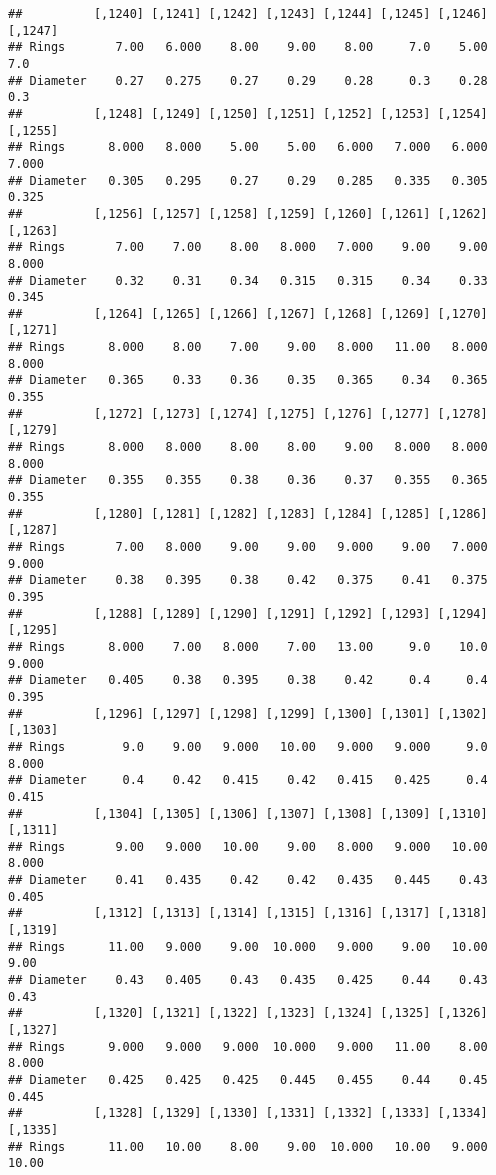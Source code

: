 \documentclass[
]{article}
\begin{document}
\begin{verbatim}
##          [,1240] [,1241] [,1242] [,1243] [,1244] [,1245] [,1246] [,1247]
## Rings       7.00   6.000    8.00    9.00    8.00     7.0    5.00     7.0
## Diameter    0.27   0.275    0.27    0.29    0.28     0.3    0.28     0.3
##          [,1248] [,1249] [,1250] [,1251] [,1252] [,1253] [,1254] [,1255]
## Rings      8.000   8.000    5.00    5.00   6.000   7.000   6.000   7.000
## Diameter   0.305   0.295    0.27    0.29   0.285   0.335   0.305   0.325
##          [,1256] [,1257] [,1258] [,1259] [,1260] [,1261] [,1262] [,1263]
## Rings       7.00    7.00    8.00   8.000   7.000    9.00    9.00   8.000
## Diameter    0.32    0.31    0.34   0.315   0.315    0.34    0.33   0.345
##          [,1264] [,1265] [,1266] [,1267] [,1268] [,1269] [,1270] [,1271]
## Rings      8.000    8.00    7.00    9.00   8.000   11.00   8.000   8.000
## Diameter   0.365    0.33    0.36    0.35   0.365    0.34   0.365   0.355
##          [,1272] [,1273] [,1274] [,1275] [,1276] [,1277] [,1278] [,1279]
## Rings      8.000   8.000    8.00    8.00    9.00   8.000   8.000   8.000
## Diameter   0.355   0.355    0.38    0.36    0.37   0.355   0.365   0.355
##          [,1280] [,1281] [,1282] [,1283] [,1284] [,1285] [,1286] [,1287]
## Rings       7.00   8.000    9.00    9.00   9.000    9.00   7.000   9.000
## Diameter    0.38   0.395    0.38    0.42   0.375    0.41   0.375   0.395
##          [,1288] [,1289] [,1290] [,1291] [,1292] [,1293] [,1294] [,1295]
## Rings      8.000    7.00   8.000    7.00   13.00     9.0    10.0   9.000
## Diameter   0.405    0.38   0.395    0.38    0.42     0.4     0.4   0.395
##          [,1296] [,1297] [,1298] [,1299] [,1300] [,1301] [,1302] [,1303]
## Rings        9.0    9.00   9.000   10.00   9.000   9.000     9.0   8.000
## Diameter     0.4    0.42   0.415    0.42   0.415   0.425     0.4   0.415
##          [,1304] [,1305] [,1306] [,1307] [,1308] [,1309] [,1310] [,1311]
## Rings       9.00   9.000   10.00    9.00   8.000   9.000   10.00   8.000
## Diameter    0.41   0.435    0.42    0.42   0.435   0.445    0.43   0.405
##          [,1312] [,1313] [,1314] [,1315] [,1316] [,1317] [,1318] [,1319]
## Rings      11.00   9.000    9.00  10.000   9.000    9.00   10.00    9.00
## Diameter    0.43   0.405    0.43   0.435   0.425    0.44    0.43    0.43
##          [,1320] [,1321] [,1322] [,1323] [,1324] [,1325] [,1326] [,1327]
## Rings      9.000   9.000   9.000  10.000   9.000   11.00    8.00   8.000
## Diameter   0.425   0.425   0.425   0.445   0.455    0.44    0.45   0.445
##          [,1328] [,1329] [,1330] [,1331] [,1332] [,1333] [,1334] [,1335]
## Rings      11.00   10.00    8.00    9.00  10.000   10.00   9.000   10.00

\end{verbatim}
\end{document}
